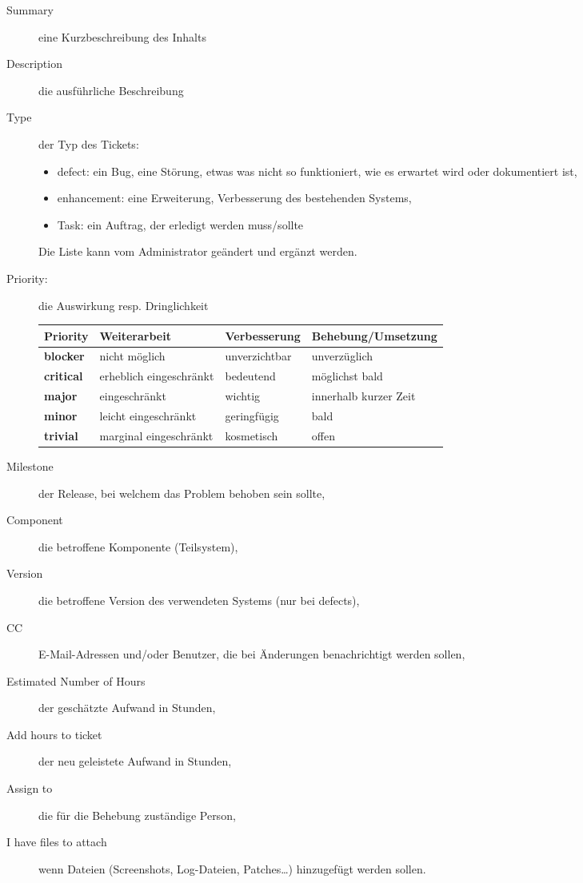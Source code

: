   \begin{description}
    \item [Summary] eine Kurzbeschreibung des Inhalts
    \item [Description] die ausführliche Beschreibung
    \item[Type] der Typ des Tickets:
      \begin{itemize}
      \item defect: ein Bug, eine Störung, etwas was nicht so
        funktioniert, wie es
        erwartet wird oder dokumentiert ist,
      \item enhancement: eine Erweiterung, Verbesserung des
        bestehenden Systems,
      \item Task: ein Auftrag, der erledigt werden muss/sollte
      \end{itemize}
      Die Liste kann vom Administrator geändert und ergänzt werden.
\newslide
      \item [Priority:] die Auswirkung resp. Dringlichkeit
        \begin{center}
        \begin{tabular}{llll}
          Priority & Weiterarbeit & Verbesserung & Behebung/Umsetzung\\
          \hline
         {\bfseries blocker} &  nicht möglich & unverzichtbar & unverzüglich \\
         {\bfseries critical} & erheblich eingeschränkt & bedeutend & möglichst bald\\
       {\bfseries major} & eingeschränkt & wichtig & innerhalb kurzer Zeit\\
        {\bfseries minor} & leicht eingeschränkt & geringfügig & bald \\
        {\bfseries trivial} & marginal eingeschränkt & kosmetisch & offen \\
      \end{tabular}
    \end{center}
\newslide
  \item[Milestone] der Release, bei welchem das Problem behoben sein
    sollte,
  \item[Component] die betroffene Komponente (Teilsystem),
  \item[Version] die betroffene Version des verwendeten Systems (nur
    bei defects),
  \item[CC] E-Mail-Adressen und/oder Benutzer, die bei Änderungen
    benachrichtigt werden sollen,
   \item[Estimated Number of Hours] der geschätzte Aufwand in Stunden,
   \item[Add hours to ticket] der neu geleistete Aufwand in Stunden,
   \item[Assign to] die für die Behebung zuständige Person,
   \item[I have files to attach] wenn Dateien (Screenshots,
     Log-Dateien, Patches\ldots) hinzugefügt werden sollen.
  \end{description}
%
\newslide
